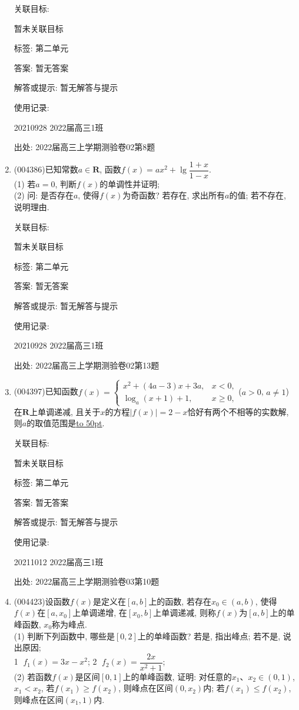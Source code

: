 \documentclass[10pt,a4paper]{article}
\newcommand{\blank}[1]{\underline{\hbox to #1pt{}}}
\begin{document}
\begin{enumerate}[1.]
关联目标:

暂未关联目标



标签: 第二单元

答案: 暂无答案

解答或提示: 暂无解答与提示

使用记录:

20210928	2022届高三1班	


出处: 2022届高三上学期测验卷02第8题
\item { (004386)}已知常数$a\in \mathbf{R}$, 函数$f(x)=ax^2+\lg \dfrac{1+x}{1-x}$.\\
(1) 若$a=0$, 判断$f(x)$的单调性并证明;\\
(2) 问: 是否存在$a$, 使得$f(x)$为奇函数? 若存在, 求出所有$a$的值; 若不存在, 说明理由.


关联目标:

暂未关联目标



标签: 第二单元

答案: 暂无答案

解答或提示: 暂无解答与提示

使用记录:

20210928	2022届高三1班		


出处: 2022届高三上学期测验卷02第13题
\item { (004397)}已知函数$f(x)=\begin{cases}  x^2+(4a-3)x+3a,& x<0, \\ \log_a(x+1)+1,& x\ge 0, \end{cases}$($a>0$, $a\ne 1$)在$\mathbf{R}$上单调递减, 且关于$x$的方程$|f(x)|=2-x$恰好有两个不相等的实数解, 则$a$的取值范围是\blank{50}.


关联目标:

暂未关联目标



标签: 第二单元

答案: 暂无答案

解答或提示: 暂无解答与提示

使用记录:

20211012	2022届高三1班	


出处: 2022届高三上学期测验卷03第10题
\item { (004423)}设函数$f(x)$是定义在$[a,b]$上的函数, 若存在$x_0\in (a,b)$, 使得$f(x)$在$[a,x_0]$上单调递增, 在$[x_0,b]$上单调递减, 则称$f(x)$为$[a,b]$上的单峰函数, $x_0$称为峰点.\\
(1) 判断下列函数中, 哪些是$[0,2]$上的单峰函数? 若是, 指出峰点; 若不是, 说出原因;\\
\textcircled{1}  $f_1(x)=3x-x^2$; \textcircled{2}  $f_2(x)=\dfrac{2x}{{x^2}+1}$;\\
(2) 若函数$f(x)$是区间$[0,1]$上的单峰函数, 证明: 对任意的$x_1$、$x_2\in (0,1)$, $x_1<x_2$, 若$f(x_1)\ge f(x_2)$, 则峰点在区间$(0,x_2)$内; 若$f(x_1)\le f(x_2)$, 则峰点在区间$(x_1,1)$内.



\end{enumerate}
\end{document}
